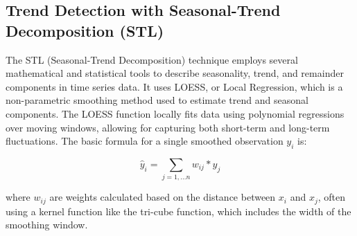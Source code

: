 \subsection{Trend Detection with Seasonal-Trend Decomposition (STL)}
The STL (Seasonal-Trend Decomposition) technique \cite{STL} employs several mathematical and statistical tools to describe seasonality, trend, and remainder components in time series data. 
It uses LOESS, or Local Regression, which is a non-parametric smoothing method used to estimate trend and seasonal components. 
The LOESS function locally fits data using polynomial regressions over moving windows, allowing for capturing both short-term and long-term fluctuations. 
The basic formula for a single smoothed observation $y_i$ is:

\[\widehat{y}_i = \sum_{j=1,...n} w_{ij} * y_j\]

where $w_{ij}$ are weights calculated based on the distance between $x_i$ and $x_j$, often using a kernel function like the tri-cube function, which includes the width of the smoothing window.